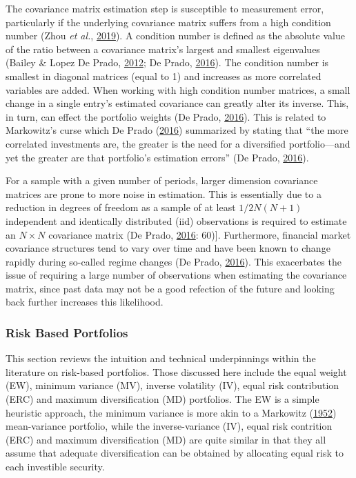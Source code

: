 \documentclass[11pt,preprint, authoryear]{elsarticle}
\numberwithin{equation}{section}
\numberwithin{figure}{section}
\numberwithin{table}{section}
\begin{document}
The covariance matrix estimation step is susceptible to measurement
error, particularly if the underlying covariance matrix suffers from a
high condition number (Zhou \emph{et al.},
\protect\hyperlink{ref-zhou2019}{2019}). A condition number is defined
as the absolute value of the ratio between a covariance matrix's largest
and smallest eigenvalues (Bailey \& Lopez De Prado,
\protect\hyperlink{ref-lopez2012}{2012}; De Prado,
\protect\hyperlink{ref-lopez}{2016}). The condition number is smallest
in diagonal matrices (equal to 1) and increases as more correlated
variables are added. When working with high condition number matrices, a
small change in a single entry's estimated covariance can greatly alter
its inverse. This, in turn, can effect the portfolio weights (De Prado,
\protect\hyperlink{ref-lopez}{2016}). This is related to Markowitz's
curse which De Prado (\protect\hyperlink{ref-lopez}{2016}) summarized by
stating that ``the more correlated investments are, the greater is the
need for a diversified portfolio---and yet the greater are that
portfolio's estimation errors'' (De Prado,
\protect\hyperlink{ref-lopez}{2016}).

For a sample with a given number of periods, larger dimension covariance
matrices are prone to more noise in estimation. This is essentially due
to a reduction in degrees of freedom as a sample of at least
\(1/2N(N+1)\) independent and identically distributed (iid) observations
is required to estimate an \(N\times N\) covariance matrix (De Prado,
\protect\hyperlink{ref-lopez}{2016}: 60){]}. Furthermore, financial
market covariance structures tend to vary over time and have been known
to change rapidly during so-called regime changes (De Prado,
\protect\hyperlink{ref-lopez}{2016}). This exacerbates the issue of
requiring a large number of observations when estimating the covariance
matrix, since past data may not be a good refection of the future and
looking back further increases this likelihood.

\hypertarget{risk-based-portfolios}{%
\subsubsection{Risk Based Portfolios}\label{risk-based-portfolios}}

This section reviews the intuition and technical underpinnings within
the literature on risk-based portfolios. Those discussed here include
the equal weight (EW), minimum variance (MV), inverse volatility (IV),
equal risk contribution (ERC) and maximum diversification (MD)
portfolios. The EW is a simple heuristic approach, the minimum variance
is more akin to a Markowitz (\protect\hyperlink{ref-markowitz}{1952})
mean-variance portfolio, while the inverse-variance (IV), equal risk
contrition (ERC) and maximum diversification (MD) are quite similar in
that they all assume that adequate diversification can be obtained by
allocating equal risk to each investible security.
\end{document}
